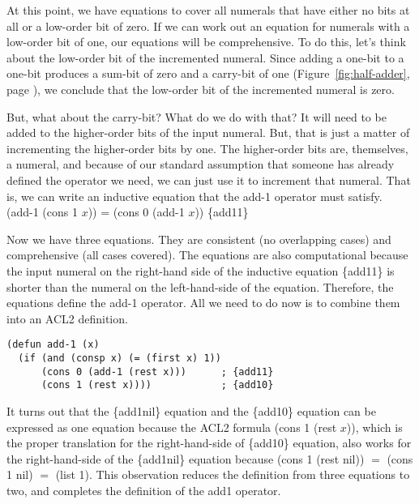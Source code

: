 At this point, we have equations to cover all numerals
that have either no bits at all or a low-order bit
of zero. If we can work out an equation for numerals
with a low-order bit of one, our equations will be comprehensive.
To do this, let's think about the
low-order bit of the incremented numeral.
Since adding a one-bit to a one-bit produces a sum-bit
of zero and a carry-bit of one
(Figure~\ref{fig:half-adder}, page \pageref{fig:half-adder}),
we conclude that the low-order bit of the incremented numeral
is zero.

But, what about the carry-bit? What do we do with that?
It will need to be added to the higher-order bits of
the input numeral. But, that is just a matter of incrementing
the higher-order bits by one.
The higher-order bits are, themselves, a numeral,
and because of our standard assumption that
someone has already defined the operator we need,
we can just use it to increment that numeral.
That is, we can write an inductive equation that the add-1 operator
must satisfy.
\\
\vspace{2mm}
\hspace*{2cm}
(add-1 (cons 1 $x$)) = (cons 0 (add-1 $x$))   \hfill \{add11\}

Now we have three equations.
They are consistent (no overlapping cases) and
comprehensive (all cases covered).
The equations are also computational because the input numeral
on the right-hand side of the inductive equation
\{add11\} is shorter than
the numeral on the left-hand-side of the equation.
Therefore, the equations define the add-1 operator.
All we need to do now is to combine them into an ACL2 definition.

\label{add-1-defun}
\begin{Verbatim}
(defun add-1 (x)
  (if (and (consp x) (= (first x) 1))
      (cons 0 (add-1 (rest x)))      ; {add11}
      (cons 1 (rest x))))            ; {add10}
\end{Verbatim}

It turns out that the \{add1nil\} equation
and the \{add10\} equation can be expressed as one equation because
the ACL2 formula (cons 1 (rest $x$)), which is the proper
translation for the right-hand-side of \{add10\} equation,
also works for the right-hand-side of the \{add1nil\} equation
because (cons 1 (rest nil)) $=$ (cons 1 nil) $=$ (list 1).
This observation reduces the definition from three equations to two,
and completes the definition of the add1 operator.

